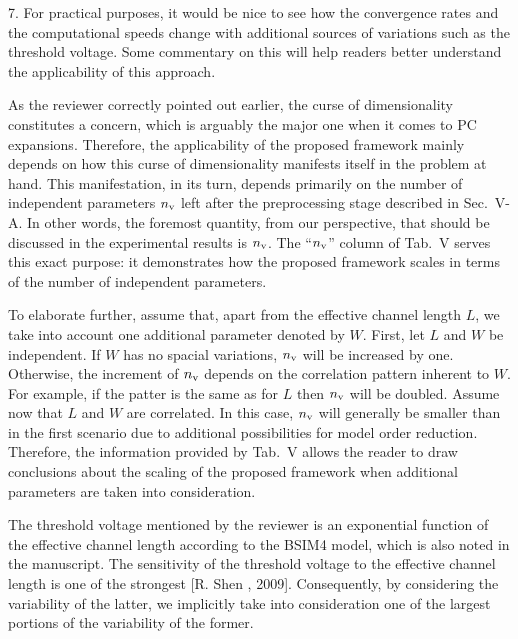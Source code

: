 \begin{reviewer}
7. For practical purposes, it would be nice to see how the convergence rates and the computational speeds change with additional sources of variations such as the threshold voltage. Some commentary on this will help readers better understand the applicability of this approach.
\end{reviewer}
\begin{authors}
As the reviewer correctly pointed out earlier, the curse of dimensionality constitutes a concern, which is arguably the major one when it comes to PC expansions.
Therefore, the applicability of the proposed framework mainly depends on how this curse of dimensionality manifests itself in the problem at hand.
This manifestation, in its turn, depends primarily on the number of independent parameters ${n_\text{v}}$ left after the preprocessing stage described in Sec.~V-A.
In other words, the foremost quantity, from our perspective, that should be discussed in the experimental results is ${n_\text{v}}$.
The ``${n_\text{v}}$'' column of Tab.~V serves this exact purpose: it demonstrates how the proposed framework scales in terms of the number of independent parameters.

To elaborate further, assume that, apart from the effective channel length $L$, we take into account one additional parameter denoted by $W$.
First, let $L$ and $W$ be independent.
If $W$ has no spacial variations, ${n_\text{v}}$ will be increased by one.
Otherwise, the increment of ${n_\text{v}}$ depends on the correlation pattern inherent to $W$.
For example, if the patter is the same as for $L$ then ${n_\text{v}}$ will be doubled.
Assume now that $L$ and $W$ are correlated.
In this case, ${n_\text{v}}$ will generally be smaller than in the first scenario due to additional possibilities for model order reduction.
Therefore, the information provided by Tab.~V allows the reader to draw conclusions about the scaling of the proposed framework when additional parameters are taken into consideration.

The threshold voltage mentioned by the reviewer is an exponential function of the effective channel length according to the BSIM4 model, which is also noted in the manuscript.
The sensitivity of the threshold voltage to the effective channel length is one of the strongest [R. Shen \etal, 2009].
Consequently, by considering the variability of the latter, we implicitly take into consideration one of the largest portions of the variability of the former.

\end{authors}
